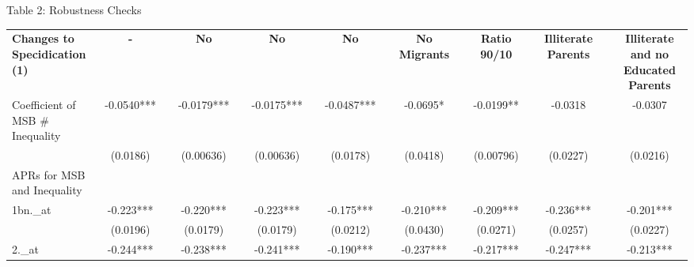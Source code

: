 \documentclass{beamer}
\begin{document}
\begin{frame}{Table 2: Robustness Checks}
\begin{table}[htbp]
\begin{adjustbox}{max width=\textwidth}
\begin{tabular}{llllllllllllllll}
    \textbf{Changes to Specidication (1)} & \multicolumn{1}{c}{\textbf{-}} &       & \multicolumn{1}{c}{\textbf{No}} &       & \multicolumn{1}{c}{\textbf{No}} &       & \multicolumn{1}{c}{\textbf{No}} &       & \multicolumn{1}{c}{\textbf{No Migrants}} &       & \multicolumn{1}{c}{\textbf{Ratio 90/10}} &       & \multicolumn{1}{c}{\textbf{Illiterate Parents}} &       & \multicolumn{1}{c}{\textbf{Illiterate and no Educated Parents}} \\
\cmidrule{2-2}\cmidrule{4-4}\cmidrule{6-6}\cmidrule{8-8}\cmidrule{10-10}\cmidrule{12-12}\cmidrule{14-14}\cmidrule{16-16}    Coefficient of MSB  \# Inequality & \multicolumn{1}{c}{-0.0540***} &       & \multicolumn{1}{c}{-0.0179***} &       & \multicolumn{1}{c}{-0.0175***} &       & \multicolumn{1}{c}{-0.0487***} &       & \multicolumn{1}{c}{-0.0695*} &       & \multicolumn{1}{c}{-0.0199**} &       & \multicolumn{1}{c}{-0.0318} &       & \multicolumn{1}{c}{-0.0307} \\
          & \multicolumn{1}{c}{(0.0186)} &       & \multicolumn{1}{c}{(0.00636)} &       & \multicolumn{1}{c}{(0.00636)} &       & \multicolumn{1}{c}{(0.0178)} &       & \multicolumn{1}{c}{(0.0418)} &       & \multicolumn{1}{c}{(0.00796)} &       & \multicolumn{1}{c}{(0.0227)} &       & \multicolumn{1}{c}{(0.0216)} \\
    APRs for MSB and Inequality &       &       &       &       &       &       &       &       &       &       &       &       &       &       &  \\
    1bn.\_at & \multicolumn{1}{c}{-0.223***} &       & \multicolumn{1}{c}{-0.220***} &       & \multicolumn{1}{c}{-0.223***} &       & \multicolumn{1}{c}{-0.175***} &       & \multicolumn{1}{c}{-0.210***} &       & \multicolumn{1}{c}{-0.209***} &       & \multicolumn{1}{c}{-0.236***} &       & \multicolumn{1}{c}{-0.201***} \\
          & \multicolumn{1}{c}{(0.0196)} &       & \multicolumn{1}{c}{(0.0179)} &       & \multicolumn{1}{c}{(0.0179)} &       & \multicolumn{1}{c}{(0.0212)} &       & \multicolumn{1}{c}{(0.0430)} &       & \multicolumn{1}{c}{(0.0271)} &       & \multicolumn{1}{c}{(0.0257)} &       & \multicolumn{1}{c}{(0.0227)} \\
    2.\_at & \multicolumn{1}{c}{-0.244***} &       & \multicolumn{1}{c}{-0.238***} &       & \multicolumn{1}{c}{-0.241***} &       & \multicolumn{1}{c}{-0.190***} &       & \multicolumn{1}{c}{-0.237***} &       & \multicolumn{1}{c}{-0.217***} &       & \multicolumn{1}{c}{-0.247***} &       & \multicolumn{1}{c}{-0.213***} \\

\end{tabular}
\end{adjustbox}
\end{table}
\end{frame}
\end{document}

